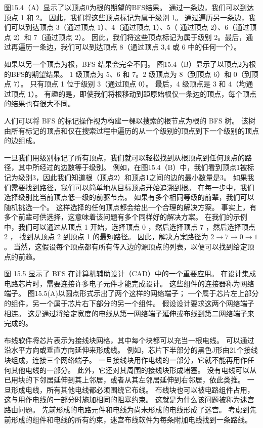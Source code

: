 图15.4（A）显示了以顶点0为根的期望的BFS结果。 通过一条边，我们可以到达顶点 1 和 2。
因此，我们将这些顶点标记为属于级别 1。
通过遍历另一条边，我们可以到达顶点 3（通过顶点 1）、4（通过顶点 1）、5（ 通过顶点 2）、6（通过顶点 2）和 7（通过顶点 2）。 
因此，我们将这些顶点标记为属于级别 2。最后，通过再遍历一条边，我们可以到达顶点 8（通过顶点 3,4 或 6 中的任何一个）。

如果以另一个顶点为根，BFS 结果会完全不同。 图15.4（B）显示了以顶点2为根的BFS的期望结果。 
1 级顶点为 5、6 和 7。2 级顶点为 8（到顶点 6）和 0（到顶点 7）。 只有顶点 1 位于级别 3（通过顶点 0）。 
最后，4 级顶点是 3 和 4（均通过顶点 1）。 有趣的是，即使我们将根移动到距原始根仅一条边的顶点，每个顶点的结果也有很大不同。

人们可以将 BFS 的标记操作视为构建一棵以搜索的根节点为根的 BFS 树。 
该树由所有标记的顶点和仅在搜索过程中遍历的从一个级别的顶点到下一个级别的顶点的边组成。

一旦我们用级别标记了所有顶点，我们就可以轻松找到从根顶点到任何顶点的路径，其中所经过的边数等于级别。 
例如，在图15.4（B）中，我们看到顶点1被标记为级别3，因此我们知道根（顶点2）和顶点1之间的边的最小数量是3。 
如果我们需要找到路径，我们可以简单地从目标顶点开始追溯到根。 在每一步中，我们选择级别比当前顶点低一级的前驱节点。 
如果有多个相同等级的前辈，我们可以随机挑选一个。 这样选择的任何顶点都会给出一个合理的解决方案。 
事实上，有多个前辈可供选择，这意味着该问题有多个同样好的解决方案。 
在我们的示例中，我们可以通过从顶点 1 开始，选择顶点 0 ，然后选择顶点 7 ，然后选择顶点 2 ，
找到从顶点 2 到顶点 1 的最短路径。 因此，解决方案路径为 $2 \rightarrow 7 \rightarrow 0 \rightarrow 1$。 
当然，这假设每个顶点都有所有传入边的源顶点的列表，以便可以找到给定顶点的前趋。

图 15.5 显示了 BFS 在计算机辅助设计（CAD）中的一个重要应用。 在设计集成电路芯片时，需要连接许多电子元件才能完成设计。 
这些组件的连接器称为网络端子。 图15.5(A)以圆点形式示出了两个这样的网络端子； 
一个属于芯片左上部分的组件，另一个属于芯片右下部分的另一个组件。 假设设计要求这两个网络端子相连。 
这是通过将给定宽度的电线从第一网络端子延伸或布线到第二网络端子来完成的。

布线软件将芯片表示为接线块网格，其中每个块都可以充当一根电线。 可以通过沿水平方向或垂直方向延伸来形成线。 
例如，芯片下半部分的黑色J形由21个接线块组成，连接三个网络端子。 
一旦接线块用作电线的一部分，它就不能再用作任何其他电线的一部分。 此外，它还对其周围的接线块形成堵塞。 
没有电线可以从已用块的下邻居延伸到其上邻居，或者从其左邻居延伸到右邻居，依此类推。 
一旦形成电线，所有其他电线都必须围绕它布线。 布线块也可以被电路组件占用，这与用作电线的一部分时施加相同的阻塞约束。 
这就是为什么该问题被称为迷宫路由问题。 先前形成的电路元件和电线为尚未形成的电线形成了迷宫。 
考虑到先前形成的组件和电线的所有约束，迷宫布线软件为每条附加电线找到一条路线。

